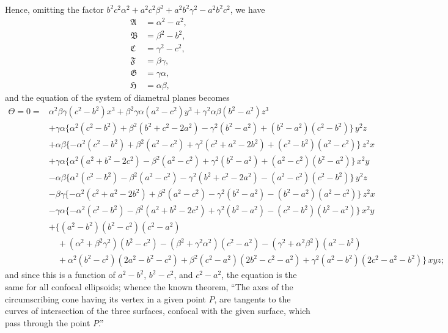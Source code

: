 \documentclass[11pt]{article}
\begin{document}
Hence, omitting the factor $b^2 c^2 \alpha^2 + a^2 c^2 \beta^2 + a^2 b^2 \gamma^2 - a^2 b^2 c^2$, we have
\begin{align*}
\mathfrak{A} &= \alpha^2 - a^2,\\
\mathfrak{B} &= \beta^2 - b^2,\\
\mathfrak{C} &= \gamma^2 - c^2,\\
\mathfrak{F} &= \beta\gamma,\\
\mathfrak{G} &= \gamma\alpha,\\
\mathfrak{H} &= \alpha\beta,
\end{align*}
and the equation of the system of diametral planes becomes
\begin{align*}
\Theta = 0 = {}& \alpha^2\beta\gamma(c^2 - b^2)x^3 + \beta^2\gamma\alpha(a^2 - c^2)y^3 + \gamma^2\alpha\beta(b^2 - a^2)z^3\\
& + \gamma\alpha\{\alpha^2(c^2 - b^2) + \beta^2(b^2 + c^2 - 2a^2) - \gamma^2(b^2 - a^2) + (b^2 - a^2)(c^2 - b^2)\}\,y^2 z\\
& + \alpha\beta\{-\alpha^2(c^2 - b^2) + \beta^2(a^2 - c^2) + \gamma^2(c^2 + a^2 - 2b^2) + (c^2 - b^2)(a^2 - c^2)\}\,z^2 x\\
& + \gamma\alpha\{\alpha^2(a^2 + b^2 - 2c^2) - \beta^2(a^2 - c^2) + \gamma^2(b^2 - a^2) + (a^2 - c^2)(b^2 - a^2)\}\,x^2 y\\
& - \alpha\beta\{\alpha^2(c^2 - b^2) - \beta^2(a^2 - c^2) - \gamma^2(b^2 + c^2 - 2a^2) - (a^2 - c^2)(c^2 - b^2)\}\,y^2 z\\
& - \beta\gamma\{-\alpha^2(c^2 + a^2 - 2b^2) + \beta^2(a^2 - c^2) - \gamma^2(b^2 - a^2) - (b^2 - a^2)(a^2 - c^2)\}\,z^2 x\\
& - \gamma\alpha\{-\alpha^2(c^2 - b^2) - \beta^2(a^2 + b^2 - 2c^2) + \gamma^2(b^2 - a^2) - (c^2 - b^2)(b^2 - a^2)\}\,x^2 y\\
& + \{(a^2 - b^2)(b^2 - c^2)(c^2 - a^2)\\
& \quad + (\alpha^2 + \beta^2\gamma^2)(b^2 - c^2) - (\beta^2 + \gamma^2\alpha^2)(c^2 - a^2) - (\gamma^2 + \alpha^2\beta^2)(a^2 - b^2)\\
& \quad + \alpha^2(b^2 - c^2)(2a^2 - b^2 - c^2) + \beta^2(c^2 - a^2)(2b^2 - c^2 - a^2) + \gamma^2(a^2 - b^2)(2c^2 - a^2 - b^2)\}\,xyz;
\end{align*}
and since this is a function of $a^2 - b^2$, $b^2 - c^2$, and $c^2 - a^2$, the equation is the same for all confocal ellipsoids; whence the known theorem, ``The axes of the circumscribing cone having its vertex in a given point $P$, are tangents to the curves of intersection of the three surfaces, confocal with the given surface, which pass through the point $P$.''
\end{document}

